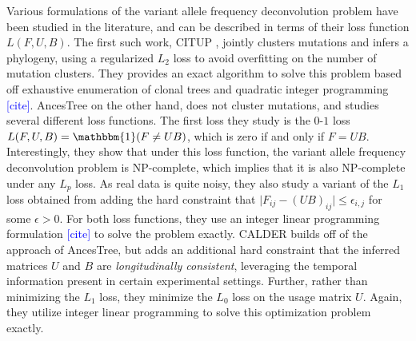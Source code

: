 \documentclass[10pt]{article}
\newcommand{\henri}[1]{\textcolor{blue}{[#1]}}
\begin{document}
Various formulations of the variant allele frequency deconvolution problem have been 
studied in the literature, and can be described in terms of their loss function $L(F, U, B)$.
The first such work, CITUP \cite{malikic_clonality_2015}, jointly clusters mutations and 
infers a phylogeny, using a regularized $L_2$ loss to avoid overfitting on the number
of mutation clusters. They provides an exact algorithm to solve this problem based 
off exhaustive enumeration of clonal trees and quadratic integer programming \henri{cite}. 
AncesTree \cite{el-kebir_reconstruction_2015} on the other hand, does not cluster mutations, 
and studies several different loss functions. The first loss they study 
is the $0$-$1$ loss $L(F, U, B) = \mathbbm{1}(F \neq UB)$, 
which is zero if and only if $F = UB$. Interestingly, they show that under this loss function,
the variant allele frequency deconvolution problem is NP-complete, which implies that it is also
NP-complete under any $L_p$ loss. As real data is quite noisy, they 
also study a variant of the $L_1$ loss obtained from adding the hard constraint 
that $\lvert F_{ij} - (UB)_{ij}\rvert \leq \epsilon_{i,j}$ for some $\epsilon > 0$. For both
loss functions, they use an integer linear programming formulation \henri{cite} to solve the 
problem exactly. CALDER \cite{myers_calder_2019} builds off of the approach of AncesTree,
but adds an additional hard constraint that the inferred matrices $U$ and $B$ are 
\emph{longitudinally consistent}, leveraging the temporal information present in certain
experimental settings. Further, rather than minimizing the $L_1$ loss, they minimize the 
$L_0$ loss on the usage matrix $U$. Again, they utilize integer linear programming
to solve this optimization problem exactly.
\end{document}
